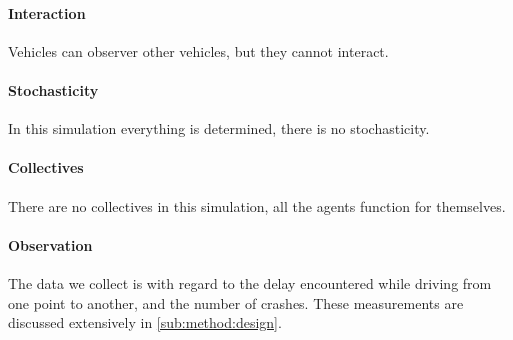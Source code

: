 \paragraph{Interaction} 
Vehicles can observer other vehicles, but they cannot interact.

\paragraph{Stochasticity} 
In this simulation everything is determined, there is no stochasticity.

\paragraph{Collectives} 
There are no collectives in this simulation, all the agents function for themselves.

\paragraph{Observation} 
The data we collect is with regard to the delay encountered while driving from one point to another, and the number of crashes. These measurements are discussed extensively in \cref{sub:method:design}.


